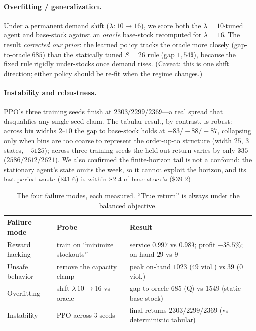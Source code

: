 \documentclass[11pt]{article}
\begin{document}
\paragraph{Overfitting / generalization.}
Under a permanent demand shift ($\lambda\!:\!10\!\to\!16$), we score both the $\lambda=10$-tuned
agent and base-stock against an \emph{oracle} base-stock recomputed for $\lambda=16$. The result
\emph{corrected our prior}: the learned policy tracks the oracle more closely (gap-to-oracle
$685$) than the statically tuned $S=26$ rule (gap $1{,}549$), because the fixed rule rigidly
under-stocks once demand rises. (Caveat: this is one shift direction; either policy should be
re-fit when the regime changes.)

\paragraph{Instability and robustness.}
PPO's three training seeds finish at $2303/2299/2369$---a real spread that disqualifies any
single-seed claim. The tabular result, by contrast, is robust: across bin widths $2$--$10$ the
gap to base-stock holds at $-83/-88/-87$, collapsing only when bins are too coarse to represent
the order-up-to structure (width $25$, $3$ states, $-5125$); across three training seeds the
held-out return varies by only $\$35$ ($2586/2612/2621$). We also confirmed the finite-horizon
tail is not a confound: the stationary agent's state omits the week, so it cannot exploit the
horizon, and its last-period waste ($\$41.6$) is within $\$2.4$ of base-stock's ($\$39.2$).

\begin{table}[t]
\centering
\caption{The four failure modes, each measured. ``True return'' is always under the balanced
objective.}
\label{tab:failure}
\begin{tabular}{lll}
\toprule
Failure mode & Probe & Result \\
\midrule
Reward hacking & train on ``minimize stockouts'' & service $0.997$ vs $0.989$; profit $-38.5\%$; on-hand $29$ vs $9$ \\
Unsafe behavior & remove the capacity clamp & peak on-hand $1023$ ($49$ viol.) vs $39$ ($0$ viol.) \\
Overfitting & shift $\lambda\,10\!\to\!16$ vs oracle & gap-to-oracle $685$ (Q) vs $1549$ (static base-stock) \\
Instability & PPO across $3$ seeds & final returns $2303/2299/2369$ (vs deterministic tabular) \\
\bottomrule
\end{tabular}
\end{table}
\end{document}
